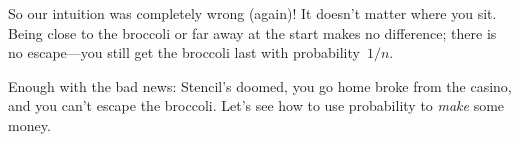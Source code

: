 So our intuition was completely wrong (again)!  It doesn't matter
where you sit.  Being close to the broccoli or far away at the start
makes no difference; there is no escape---you still get the broccoli
last with probability~$1/n$.

Enough with the bad news: Stencil's doomed, you go home broke from the
casino, and you can't escape the broccoli.  Let's see how to use
probability to \emph{make} some money.


\problemsection

\endinput
